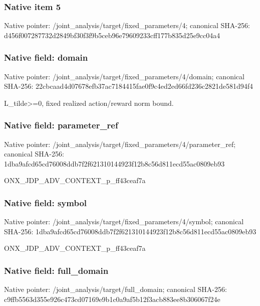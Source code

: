 \documentclass[10pt,a4paper]{article}
\begin{document}
\subsubsection{Native item 5}
Native pointer: /joint\_\allowbreak{}analysis/target/fixed\_\allowbreak{}parameters/4; canonical SHA-256: d456f007287732d2849bf30f3f9b5ceb96e79609233cff177b835d25e9cc04a4

\subsubsection{Native field: domain}
Native pointer: /joint\_\allowbreak{}analysis/target/fixed\_\allowbreak{}parameters/4/domain; canonical SHA-256: 22cbcaad4d07678efb37ac7184415fae0f9c4ed2ed66fd236c2821de581d94f4

\begingroup\raggedright\sloppy L\_\allowbreak{}tilde>=\allowbreak{}0,\allowbreak{} fixed realized action/\allowbreak{}reward norm bound.\par\endgroup

\subsubsection{Native field: parameter\_\allowbreak{}ref}
Native pointer: /joint\_\allowbreak{}analysis/target/fixed\_\allowbreak{}parameters/4/parameter\_\allowbreak{}ref; canonical SHA-256: 1dba9afcd65cd76008ddb7f2f621310144923f12b8c56d811ecd55ac0809eb93

\begingroup\raggedright\sloppy ONX\_\allowbreak{}JDP\_\allowbreak{}ADV\_\allowbreak{}CONTEXT\_\allowbreak{}p\_\allowbreak{}ff43ceaf7a\par\endgroup

\subsubsection{Native field: symbol}
Native pointer: /joint\_\allowbreak{}analysis/target/fixed\_\allowbreak{}parameters/4/symbol; canonical SHA-256: 1dba9afcd65cd76008ddb7f2f621310144923f12b8c56d811ecd55ac0809eb93

\begingroup\raggedright\sloppy ONX\_\allowbreak{}JDP\_\allowbreak{}ADV\_\allowbreak{}CONTEXT\_\allowbreak{}p\_\allowbreak{}ff43ceaf7a\par\endgroup

\subsubsection{Native field: full\_\allowbreak{}domain}
Native pointer: /joint\_\allowbreak{}analysis/target/full\_\allowbreak{}domain; canonical SHA-256: c9ffb5563d355e926c473cd07169e9b1c0a9af5b12f3acb883ee8b306067f24e
\end{document}
